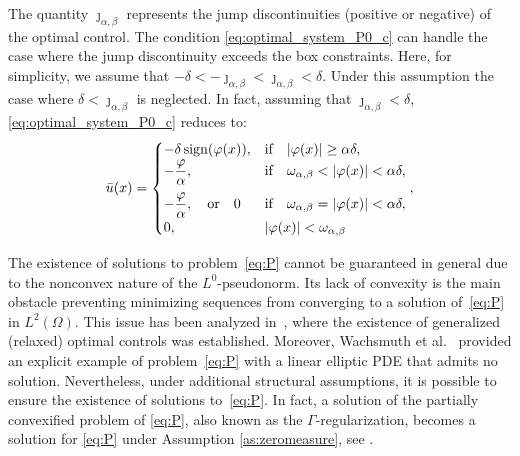 \documentclass[11pt,a4paper]{amsart}
\newcommand{\om}{\Omega}
\newcommand{\sign}{\mathrm{sign}}
\begin{document}
The quantity $\jmath_{\alpha,\beta}$ represents the jump discontinuities (positive or negative) of the optimal control. The condition \eqref{eq:optimal_system_P0_c} can handle the case where the jump discontinuity exceeds the box constraints. Here, for simplicity, we assume that  $-\delta<-\jmath_{\alpha,\beta}<\jmath_{\alpha,\beta}<\delta$. Under this assumption the case where $\delta< \jmath_{\alpha,\beta}$ is neglected. In fact, assuming that $\jmath_{\alpha,\beta}<\delta$, \eqref{eq:optimal_system_P0_c} reduces to:
\begin{equation}
\bar u(x) = 
\begin{cases} 
-\delta \,\sign(\varphi(x)), &\text{if}\quad  |\varphi(x)| \ge \alpha\delta,\\
-\dfrac{\varphi}{\alpha},&\text{if}\quad\omega_{\alpha,\beta}< |\varphi(x)|<\alpha\delta, \vspace{2mm}\\
-\dfrac{\varphi}{\alpha}, \quad\text{or}\quad 0&\text{if}\quad\omega_{\alpha,\beta}= |\varphi(x)|<\alpha\delta, \\
0, &|\varphi(x)|<\omega_{\alpha,\beta}
\end{cases}
, \label{eq:optimal_system_P0_c}
\end{equation}



The existence of solutions to problem~\eqref{eq:P} cannot be guaranteed in general due to the nonconvex nature of the $L^0$-pseudonorm. Its lack of convexity is the main obstacle preventing minimizing sequences from converging to a solution of~\eqref{eq:P} in $L^2(\Omega)$. This issue has been analyzed in~\cite{itokun2014}, where the existence of generalized (relaxed) optimal controls was established. Moreover, Wachsmuth et al.~\cite{wachsmuth19} provided an explicit example of problem~\eqref{eq:P} with a linear elliptic PDE that admits no solution. Nevertheless, under additional structural assumptions, it is possible to ensure the existence of solutions to~\eqref{eq:P}. In fact, a solution of the partially convexified problem of \eqref{eq:P}, also known as the $\Gamma$-regularization, becomes a solution for \eqref{eq:P} under Assumption \ref{as:zeromeasure}, see \cite[Corollary Corollary 4.3]{caswach20}.
\end{document}
